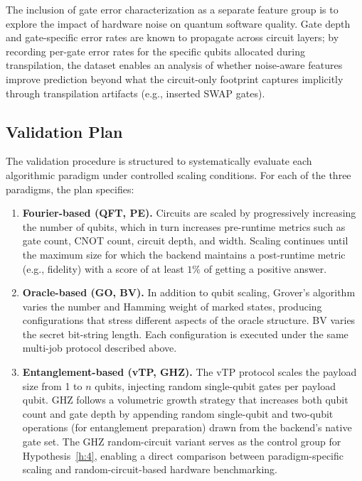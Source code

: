 \documentclass{article}
\begin{document}
The inclusion of gate error characterization as a separate feature group is to explore the impact of hardware noise on quantum software quality. Gate depth and gate-specific error rates are known to propagate across circuit layers; by recording per-gate error rates for the specific qubits allocated during transpilation, the dataset enables an analysis of whether noise-aware features improve prediction beyond what the circuit-only footprint captures implicitly through transpilation artifacts (e.g., inserted SWAP gates).

\subsection{Validation Plan}

The validation procedure is structured to systematically evaluate each algorithmic paradigm under controlled scaling conditions. For each of the three paradigms, the plan specifies:

\begin{enumerate}
\item \textbf{Fourier-based (QFT, PE).} Circuits are scaled by progressively increasing the number of qubits, which in turn increases pre-runtime metrics such as gate count, CNOT count, circuit depth, and width. Scaling continues until the maximum size for which the backend maintains a post-runtime metric (e.g., fidelity) with a score of at least $1\%$ of getting a positive answer.

\item \textbf{Oracle-based (GO, BV).} In addition to qubit scaling, Grover's algorithm varies the number and Hamming weight of marked states, producing configurations that stress different aspects of the oracle structure. BV varies the secret bit-string length. Each configuration is executed under the same multi-job protocol described above.

\item \textbf{Entanglement-based (vTP, GHZ).} The vTP protocol scales the payload size from 1 to $n$ qubits, injecting random single-qubit gates per payload qubit. GHZ follows a volumetric growth strategy that increases both qubit count and gate depth by appending random single-qubit and two-qubit operations (for entanglement preparation) drawn from the backend's native gate set. The GHZ random-circuit variant serves as the control group for Hypothesis~\ref{h:4}, enabling a direct comparison between paradigm-specific scaling and random-circuit-based hardware benchmarking.
\end{enumerate}
\end{document}
